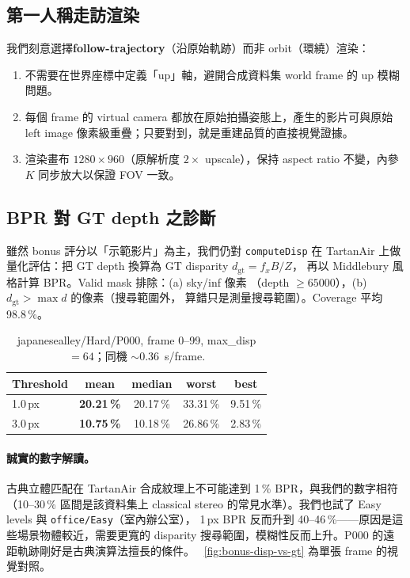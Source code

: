 \documentclass[12pt]{article}
\begin{document}
\subsection{第一人稱走訪渲染}
\label{sec:bonus-render}
我們刻意選擇\textbf{follow-trajectory}（沿原始軌跡）而非 orbit（環繞）渲染：
\begin{enumerate}
\item 不需要在世界座標中定義「up」軸，避開合成資料集 world frame 的 up 模糊問題。
\item 每個 frame 的 virtual camera 都放在原始拍攝姿態上，產生的影片可與原始
left image 像素級重疊；只要對到，就是重建品質的直接視覺證據。
\item 渲染畫布 $1280\!\times\!960$（原解析度 $2\times$ upscale），保持
aspect ratio 不變，內參 $K$ 同步放大以保證 FOV 一致。
\end{enumerate}

\subsection{BPR 對 GT depth 之診斷}
\label{sec:bonus-bpr}
雖然 bonus 評分以「示範影片」為主，我們仍對 \texttt{computeDisp} 在 TartanAir 上做
量化評估：把 GT depth 換算為 GT disparity $d_{\mathrm{gt}}=f_x B / Z$，
再以 Middlebury 風格計算 BPR。Valid mask 排除：(a) sky/inf 像素
（depth $\ge 65000$），(b) $d_{\mathrm{gt}} > \max\!d$ 的像素（搜尋範圍外，
算錯只是測量搜尋範圍）。Coverage 平均 98.8\,\%。

\begin{table}[H]\centering
\caption{japanesealley/Hard/P000, frame 0--99, max\_disp $=64$；同機 $\sim$\SI{0.36}{\second/frame}.}
\label{tab:bonus-bpr}
\begin{tabular}{lcccc}
  \toprule
  Threshold & mean & median & worst & best \\
  \midrule
  1.0\,px   & \textbf{20.21\,\%} & 20.17\,\% & 33.31\,\% & 9.51\,\% \\
  3.0\,px   & \textbf{10.75\,\%} & 10.18\,\% & 26.86\,\% & 2.83\,\% \\
  \bottomrule
\end{tabular}
\end{table}

\paragraph{誠實的數字解讀。} 古典立體匹配在 TartanAir 合成紋理上不可能達到
1\,\% BPR，與我們的數字相符（10--30\,\% 區間是該資料集上 classical
stereo 的常見水準）。我們也試了 Easy levels 與 \texttt{office/Easy}（室內辦公室），
1\,px BPR 反而升到 40--46\,\%——原因是這些場景物體較近，需要更寬的 disparity
搜尋範圍，模糊性反而上升。P000 的遠距軌跡剛好是古典演算法擅長的條件。
\figurename~\ref{fig:bonus-disp-vs-gt} 為單張 frame 的視覺對照。
\end{document}
